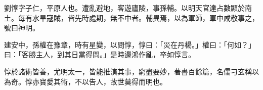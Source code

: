 
\begin{pinyinscope}
劉惇字子仁，平原人也。遭亂避地，客遊廬陵，事孫輔。以明天官達占數顯於南土。每有水旱寇賊，皆先時處期，無不中者。輔異焉，以為軍師，軍中咸敬事之，號曰神明。

建安中，孫權在豫章，時有星變，以問惇，惇曰：「災在丹楊。」權曰：「何如？」曰：「客勝主人，到其日當得問。」是時邊鴻作亂，卒如惇言。

惇於諸術皆善，尤明太一，皆能推演其事，窮盡要妙，著書百餘篇，名儒刁玄稱以為奇。惇亦寶愛其術，不以告人，故世莫得而明也。


\end{pinyinscope}